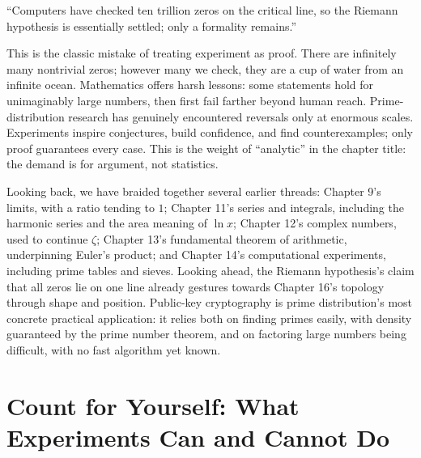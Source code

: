 \begin{fanli}
``Computers have checked ten trillion zeros on the critical line, so the Riemann hypothesis is essentially settled; only a formality remains.''

This is the classic mistake of treating experiment as proof. There are infinitely many nontrivial zeros; however many we check, they are a cup of water from an infinite ocean. Mathematics offers harsh lessons: some statements hold for unimaginably large numbers, then first fail farther beyond human reach. Prime-distribution research has genuinely encountered reversals only at enormous scales. Experiments inspire conjectures, build confidence, and find counterexamples; only proof guarantees every case. This is the weight of ``analytic'' in the chapter title: the demand is for argument, not statistics.
\end{fanli}

\begin{lianjie}
Looking back, we have braided together several earlier threads: Chapter 9's limits, with a ratio tending to $1$; Chapter 11's series and integrals, including the harmonic series and the area meaning of $\ln x$; Chapter 12's complex numbers, used to continue $\zeta$; Chapter 13's fundamental theorem of arithmetic, underpinning Euler's product; and Chapter 14's computational experiments, including prime tables and sieves. Looking ahead, the Riemann hypothesis's claim that all zeros lie on one line already gestures towards Chapter 16's topology through shape and position. Public-key cryptography is prime distribution's most concrete practical application: it relies both on finding primes easily, with density guaranteed by the prime number theorem, and on factoring large numbers being difficult, with no fast algorithm yet known.
\end{lianjie}

\section{Count for Yourself: What Experiments Can and Cannot Do}

